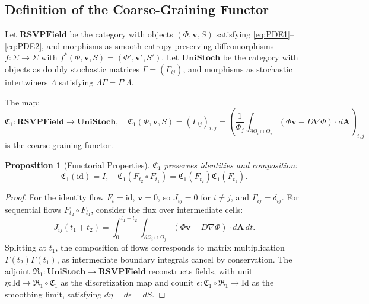 \documentclass[12pt]{article}
\newtheorem{proposition}{Proposition}
\begin{document}
\subsection{Definition of the Coarse-Graining Functor}

Let \(\mathbf{RSVPField}\) be the category with objects \((\Phi, \mathbf{v}, S)\) satisfying \eqref{eq:PDE1}–\eqref{eq:PDE2}, and morphisms as smooth entropy-preserving diffeomorphisms \(f: \Sigma \to \Sigma\) with \(f^*(\Phi, \mathbf{v}, S) = (\Phi', \mathbf{v}', S')\). Let \(\mathbf{UniStoch}\) be the category with objects as doubly stochastic matrices \(\Gamma = (\Gamma_{ij})\), and morphisms as stochastic intertwiners \(\Lambda\) satisfying \(\Lambda \Gamma = \Gamma' \Lambda\).

\begin{definition}
The map:
\[
\mathfrak{C}_1: \mathbf{RSVPField} \to \mathbf{UniStoch}, \quad \mathfrak{C}_1(\Phi, \mathbf{v}, S) = \left( \Gamma_{ij} \right)_{i,j} = \left( \frac{1}{\Phi_j} \int_{\partial \Omega_i \cap \Omega_j} (\Phi \mathbf{v} - D \nabla \Phi) \cdot d\mathbf{A} \right)_{i,j}
\]
is the coarse-graining functor.
\end{definition}

\begin{proposition}[Functorial Properties]
\label{prop:functor}
\(\mathfrak{C}_1\) preserves identities and composition:
\[
\mathfrak{C}_1(\mathrm{id}) = I, \quad \mathfrak{C}_1(F_{t_2} \circ F_{t_1}) = \mathfrak{C}_1(F_{t_2}) \mathfrak{C}_1(F_{t_1}).
\]
\end{proposition}

\begin{proof}
For the identity flow \(F_t = \mathrm{id}\), \(\mathbf{v} = 0\), so \(J_{ij} = 0\) for \(i \neq j\), and \(\Gamma_{ij} = \delta_{ij}\). For sequential flows \(F_{t_2} \circ F_{t_1}\), consider the flux over intermediate cells:
\[
J_{ij}(t_1 + t_2) = \int_0^{t_1 + t_2} \int_{\partial \Omega_i \cap \Omega_j} (\Phi \mathbf{v} - D \nabla \Phi) \cdot d\mathbf{A} \, dt.
\]
Splitting at \(t_1\), the composition of flows corresponds to matrix multiplication \(\Gamma(t_2) \Gamma(t_1)\), as intermediate boundary integrals cancel by conservation. The adjoint \(\mathfrak{R}_1: \mathbf{UniStoch} \to \mathbf{RSVPField}\) reconstructs fields, with unit \(\eta: \mathrm{Id} \to \mathfrak{R}_1 \circ \mathfrak{C}_1\) as the discretization map and counit \(\epsilon: \mathfrak{C}_1 \circ \mathfrak{R}_1 \to \mathrm{Id}\) as the smoothing limit, satisfying \(d\eta = d\epsilon = dS\).
\end{proof}
\end{document}
